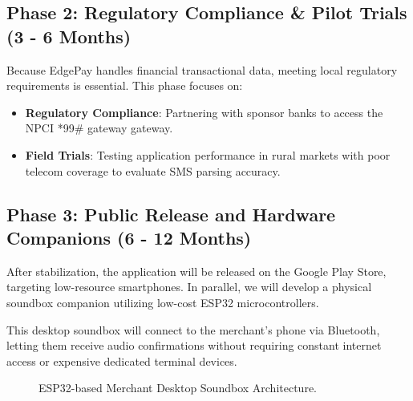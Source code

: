 \documentclass[10pt,journal,compsoc]{IEEEtran}
\begin{document}
\subsection{Phase 2: Regulatory Compliance \& Pilot Trials (3 - 6 Months)}
Because EdgePay handles financial transactional data, meeting local regulatory requirements is essential. This phase focuses on:
\begin{itemize}
    \item \textbf{Regulatory Compliance}: Partnering with sponsor banks to access the NPCI *99\# gateway gateway.
    \item \textbf{Field Trials}: Testing application performance in rural markets with poor telecom coverage to evaluate SMS parsing accuracy.
\end{itemize}

\subsection{Phase 3: Public Release and Hardware Companions (6 - 12 Months)}
After stabilization, the application will be released on the Google Play Store, targeting low-resource smartphones. In parallel, we will develop a physical soundbox companion utilizing low-cost ESP32 microcontrollers. 

This desktop soundbox will connect to the merchant's phone via Bluetooth, letting them receive audio confirmations without requiring constant internet access or expensive dedicated terminal devices.

\begin{figure}[htbp]
\centering
{}
\caption{ESP32-based Merchant Desktop Soundbox Architecture.}
\label{fig:soundbox_arch}
\end{figure}
\end{document}
